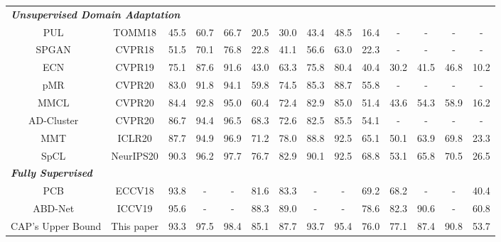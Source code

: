 \documentclass[letterpaper]{article} %
\begin{document}
\begin{table}[ht]
{\begin{tabular}{c|c|cccc|cccc|cccc}
\hline
\multicolumn{13}{l}{\textbf{\textit{Unsupervised Domain Adaptation}}} \\
PUL~\cite{unsup_clustering}  & TOMM18        & 45.5 &  60.7 &66.7 & 20.5         & 30.0 & 43.4 & 48.5 & 16.4           & - & - & - & - \\
SPGAN~\cite{deng2018similarity}  & CVPR18    & 51.5 & 70.1 & 76.8 & 22.8       & 41.1 & 56.6 & 63.0 & 22.3          & - & - & - & - \\
ECN~\cite{zhong2019invariance}    & CVPR19      & 75.1 & 87.6 & 91.6 & 43.0      & 63.3 & 75.8 & 80.4 & 40.4    & 30.2 & 41.5 & 46.8 & 10.2\\
pMR~\cite{Wang_2020_CVPR}         & CVPR20     & 83.0 & 91.8 & 94.1 & 59.8             & 74.5 & 85.3 & 88.7 & 55.8            & - & - & -  & -\\
MMCL~\cite{wang2020unsupervised} & CVPR20    & 84.4 & 92.8 & 95.0 & 60.4    & 72.4 & 82.9 & 85.0 & 51.4         & 43.6 & 54.3 & 58.9 & 16.2\\
AD-Cluster~\cite{zhai2020ad} & CVPR20 & 86.7 & 94.4 & 96.5 & 68.3 & 72.6 & 82.5 & 85.5 & 54.1 & - & - & - & - \\
MMT~\cite{ge2020mutual}   & ICLR20              &87.7 & 94.9 & 96.9 & 71.2       & 78.0 & 88.8 & 92.5 & 65.1     & 50.1 & 63.9 & 69.8 & 23.3\\
SpCL~\cite{ge2020self}        & NeurIPS20    & {\color{blue}90.3} & {\color{blue}96.2} & {\color{red}97.7} & {\color{blue}76.7}     & {\color{red}82.9} & {\color{red}90.1} & {\color{red}92.5} &{\color{red}68.8}      & {\color{blue}53.1} & {\color{blue}65.8} & {\color{blue}70.5} & 26.5\\
\hline
\multicolumn{13}{l}{\textbf{\textit{Fully Supervised}}} \\
PCB~\cite{sun2018beyond}   & ECCV18   & 93.8 &- &- & 81.6                  &83.3 &- &-   &69.2           &68.2 &- &- &40.4\\ 
ABD-Net~\cite{chen2019abd} & ICCV19 & 95.6 &- &- & 88.3 & 89.0 &- &- & 78.6 & 82.3 & 90.6 &- & 60.8 \\
CAP's Upper Bound       & This paper   & 93.3 & 97.5 & 98.4  & 85.1                 &87.7 & 93.7 & 95.4    &76.0         & 77.1 & 87.4 & 90.8  & 53.7 \\
\hline
\end{tabular}
}
\label{compare_SOTA_table}
\end{table}   %
\end{document}
